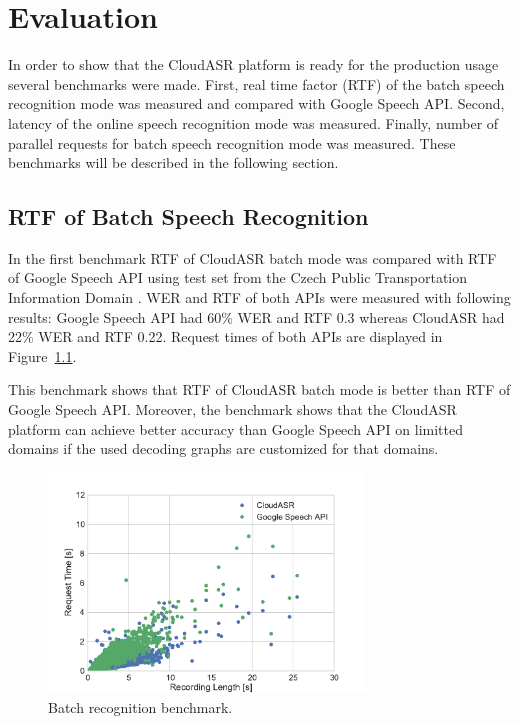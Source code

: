\chapter{Evaluation}\label{chapter:evaluation}
In order to show that the CloudASR platform is ready for the production usage
  several benchmarks were made.
First, real time factor (RTF) of the batch speech recognition mode was measured and compared with Google Speech API.
Second, latency of the online speech recognition mode was measured.
Finally, number of parallel requests for batch speech recognition mode was measured.
These benchmarks will be described in the following section.


\section{RTF of Batch Speech Recognition}
In the first benchmark RTF of CloudASR batch mode was compared with RTF of Google Speech API
  using test set from the Czech Public Transportation Information Domain \cite{korvas2014vystadial}.
WER and RTF of both APIs were measured with following results:
Google Speech API had 60\% WER and RTF 0.3 whereas
  CloudASR had 22\% WER and RTF 0.22.
Request times of both APIs are displayed in Figure~\ref{fig:batch-benchmark}.

This benchmark shows that RTF of CloudASR batch mode is better than RTF of Google Speech API.
Moreover, the benchmark shows that the CloudASR platform can achieve better accuracy than Google Speech API on limitted domains
  if the used decoding graphs are customized for that domains.


\begin{figure}[h]
  \centering
  \includegraphics[width=0.75\textwidth]{./img/batch.pdf}

  \caption{
    Batch recognition benchmark.
  }
  \label{fig:batch-benchmark}
\end{figure}



